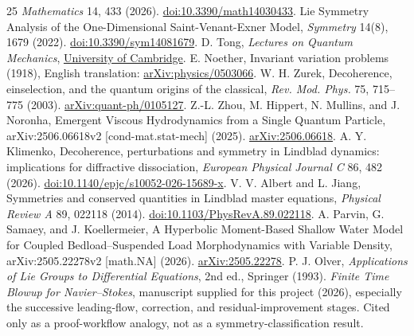 \documentclass[11pt]{article}
\begin{document}
\begin{thebibliography}{25}
\emph{Mathematics} 14, 433 (2026).
\href{https://doi.org/10.3390/math14030433}{doi:10.3390/math14030433}.
 Lie Symmetry Analysis of the One-Dimensional Saint-Venant-Exner
Model, \emph{Symmetry} 14(8), 1679 (2022).
\href{https://doi.org/10.3390/sym14081679}{doi:10.3390/sym14081679}.
 D. Tong, \emph{Lectures on Quantum Mechanics},
\href{https://www.damtp.cam.ac.uk/user/tong/qm/qmhtml/qmhtml.html}{University of Cambridge}.
 E. Noether, Invariant variation problems (1918),
English translation: \href{https://arxiv.org/abs/physics/0503066}{arXiv:physics/0503066}.
 W. H. Zurek, Decoherence, einselection, and the quantum origins
of the classical, \emph{Rev. Mod. Phys.} 75, 715--775 (2003).
\href{https://arxiv.org/abs/quant-ph/0105127}{arXiv:quant-ph/0105127}.
 Z.-L. Zhou, M. Hippert, N. Mullins, and J. Noronha,
Emergent Viscous Hydrodynamics from a Single Quantum Particle,
arXiv:2506.06618v2 [cond-mat.stat-mech] (2025).
\href{https://arxiv.org/abs/2506.06618}{arXiv:2506.06618}.
 A. Y. Klimenko, Decoherence, perturbations and symmetry in
Lindblad dynamics: implications for diffractive dissociation,
\emph{European Physical Journal C} 86, 482 (2026).
\href{https://doi.org/10.1140/epjc/s10052-026-15689-x}{doi:10.1140/epjc/s10052-026-15689-x}.
 V. V. Albert and L. Jiang, Symmetries and conserved
quantities in Lindblad master equations, \emph{Physical Review A} 89, 022118
(2014). \href{https://doi.org/10.1103/PhysRevA.89.022118}{doi:10.1103/PhysRevA.89.022118}.
 A. Parvin, G. Samaey, and J. Koellermeier, A Hyperbolic
Moment-Based Shallow Water Model for Coupled Bedload--Suspended Load
Morphodynamics with Variable Density, arXiv:2505.22278v2 [math.NA] (2026).
\href{https://arxiv.org/abs/2505.22278}{arXiv:2505.22278}.
 P. J. Olver, \emph{Applications of Lie Groups to Differential
Equations}, 2nd ed., Springer (1993).
 \emph{Finite Time Blowup for Navier--Stokes}, manuscript
supplied for this project (2026), especially the successive leading-flow,
correction, and residual-improvement stages. Cited only as a proof-workflow
analogy, not as a symmetry-classification result.
\end{thebibliography}
\end{document}
